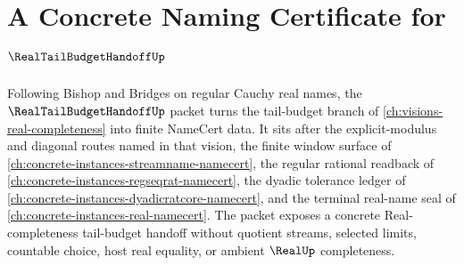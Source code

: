 \chapter{A Concrete Naming Certificate for $\RealTailBudgetHandoffUp$}
\label{ch:concrete-instances-real-tail-budget-handoff-namecert}

Following Bishop and Bridges on regular Cauchy real names, the $\RealTailBudgetHandoffUp$ packet turns the tail-budget branch of \autoref{ch:visions-real-completeness} into finite NameCert data. It sits after the explicit-modulus and diagonal routes named in that vision, the finite window surface of \autoref{ch:concrete-instances-streamname-namecert}, the regular rational readback of \autoref{ch:concrete-instances-regseqrat-namecert}, the dyadic tolerance ledger of \autoref{ch:concrete-instances-dyadicratcore-namecert}, and the terminal real-name seal of \autoref{ch:concrete-instances-real-namecert}. The packet exposes a concrete Real-completeness tail-budget handoff without quotient streams, selected limits, countable choice, host real equality, or ambient $\RealUp$ completeness.


